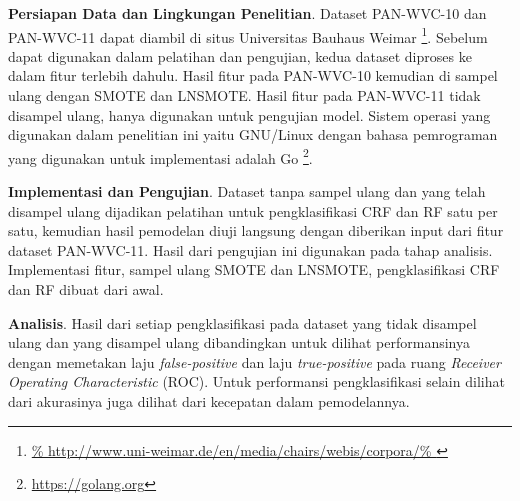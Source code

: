 \textbf{Persiapan Data dan Lingkungan Penelitian}.
Dataset PAN-WVC-10 dan PAN-WVC-11 dapat diambil di situs Universitas Bauhaus
Weimar
\footnote{%
	\RaggedRight\url{%
	http://www.uni-weimar.de/en/media/chairs/webis/corpora/%
}}.
Sebelum dapat digunakan dalam pelatihan dan pengujian, kedua dataset diproses
ke dalam fitur terlebih dahulu.
Hasil fitur pada PAN-WVC-10 kemudian di sampel ulang dengan SMOTE dan LNSMOTE.
Hasil fitur pada PAN-WVC-11 tidak disampel ulang, hanya digunakan untuk
pengujian model.
Sistem operasi yang digunakan dalam penelitian ini yaitu GNU/Linux dengan
bahasa pemrograman yang digunakan untuk implementasi adalah Go
\footnote{\RaggedRight\url{https://golang.org}}.


\textbf{Implementasi dan Pengujian}.
Dataset tanpa sampel ulang dan yang telah disampel ulang dijadikan
pelatihan untuk pengklasifikasi CRF dan RF satu per satu, kemudian hasil
pemodelan diuji langsung dengan diberikan input dari fitur dataset PAN-WVC-11.
Hasil dari pengujian ini digunakan pada tahap analisis.
Implementasi fitur, sampel ulang SMOTE dan LNSMOTE, pengklasifikasi CRF dan RF
dibuat dari awal.

\textbf{Analisis}.
Hasil dari setiap pengklasifikasi pada dataset yang tidak disampel ulang dan
yang disampel ulang dibandingkan untuk dilihat performansinya dengan memetakan
laju \textit{false-positive} dan laju \textit{true-positive} pada ruang
\textit{Receiver Operating Characteristic} (ROC).
Untuk performansi pengklasifikasi selain dilihat dari akurasinya juga dilihat
dari kecepatan dalam pemodelannya.



